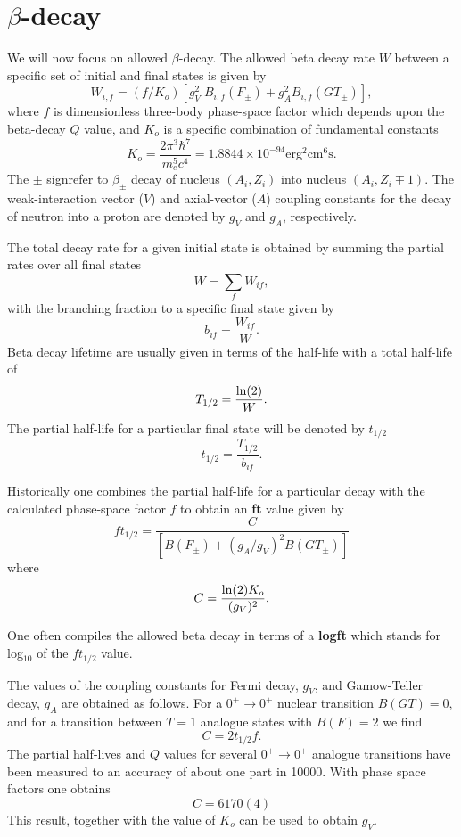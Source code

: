 \documentclass[graybox,sectrefs,envcountresetchap,open=right]{svmonodo}
\begin{document}
\section{$\beta$-decay}

We will now focus on  allowed $\beta$-decay.  
The allowed beta decay rate $W$ between a specific set of
initial and final states is given by
\[
W_{i,f} = (f/K_{o}) \left[ g_{V}^{2} \; B_{i,f}(F_{\pm})+ g_{A}^{2}B_{i,f}(GT_{\pm})\right], 
\]
where $f$ is dimensionless three-body
phase-space factor which depends upon the
beta-decay $Q$ value,
and $K_{o}$ is a specific combination of fundamental constants
\[
  K_{o}=\frac{2\pi^{3}\hbar^{7}}{ m_{e}^{5} c^{4}}= 1.8844 \times 10^{-94}\mathrm{erg}^{2}\mathrm{cm}^{6}\mathrm{s}. 
\]
The $\pm$ signrefer to $\beta_{\pm}$ decay of nucleus
$(A_{i},Z_{i})$ into nucleus $(A_{i},Z_{i} \mp 1)  $.
The weak-interaction vector ($V$) and axial-vector ($A$) coupling
constants for the decay of neutron into a proton are denoted by $g_{V}$
and $g_{A}$, respectively.

The total decay rate for a given
initial state is obtained by summing the partial rates over all
final states
\[
W = \displaystyle\sum _{f} W_{if}, 
\]
with the branching fraction to a specific final state given by
\[
b_{if} = \frac{W_{if}}{W}.  
\]
Beta decay lifetime are usually given in terms of the half-life with
a total half-life of
\[
T_{1/2} = \frac{{\rm ln}(2)}{W}.
\]
The partial half-life for a particular final state will be
denoted by $  t_{1/2}  $
\[
t_{1/2} = \frac{T_{1/2}}{b_{if}}. 
\]

Historically
one combines the partial half-life for a particular decay
with the calculated
phase-space factor $f$ to obtain  an \textbf{ft} value given by
\[
  f t_{1/2}=\frac{C }{\left[B(F_{\pm})+(g_{A}/g_{V})^{2} B(GT_{\pm}) \right] }  
\]
where
\[
  C = \frac{{\rm ln}(2)K_{o}}{(g_{V})^{2}}. 
\]

One often compiles the allowed beta decay in terms of a \textbf{logft}
which stands for log$_{10}$ of the $ft_{1/2}$ value.

     The values of the coupling constants for Fermi decay,
$g_{V}$, and Gamow-Teller decay, $g_{A}$ are obtained as follows.
For a $0^{+} \rightarrow  0^{+}$ nuclear transition $B(GT)=0$, and for a
transition between $  T=1  $ analogue states with $B(F)=2$ we find 
\[
       C = 2 t_{1/2} f.  
\]
The partial half-lives and $Q$ values for several $0^{+} \rightarrow  0^{+}$ analogue
transitions have been measured to an accuracy of about one part in
10000. With  phase space factors one obtains 
\[
      C = 6170(4)    
\]
This result, together with the value of $K_{o}$ can be used to obtain $g_{V}$.
\end{document}
